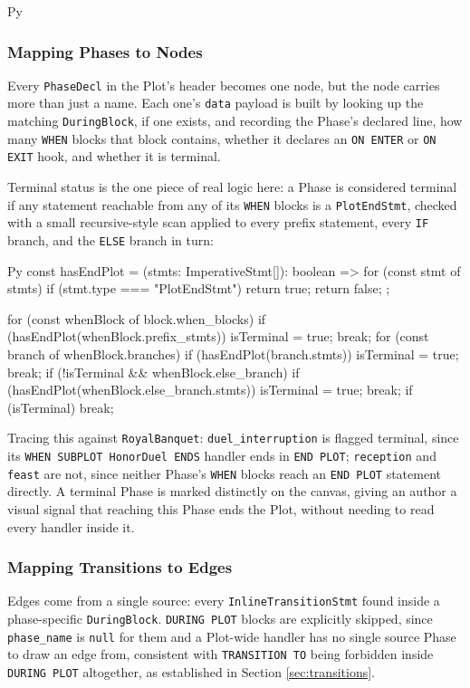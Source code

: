 \begin{codeblock}[]{Py}
\subsubsection{Mapping Phases to Nodes}
Every \lstinline|PhaseDecl| in the Plot's header becomes one node, but the node carries more than just a name. Each one's \lstinline|data| payload is built by looking up the matching \lstinline|DuringBlock|, if one exists, and recording the Phase's declared line, how many \lstinline|WHEN| blocks that block contains, whether it declares an \lstinline|ON ENTER| or \lstinline|ON EXIT| hook, and whether it is terminal.

Terminal status is the one piece of real logic here: a Phase is considered terminal if any statement reachable from any of its \lstinline|WHEN| blocks is a \lstinline|PlotEndStmt|, checked with a small recursive-style scan applied to every prefix statement, every \lstinline|IF| branch, and the \lstinline|ELSE| branch in turn:
\begin{codeblock}[]{Py}
const hasEndPlot = (stmts: ImperativeStmt[]): boolean => {
    for (const stmt of stmts) {
        if (stmt.type === "PlotEndStmt") return true;
    }
    return false;
};

for (const whenBlock of block.when_blocks) {
    if (hasEndPlot(whenBlock.prefix_stmts)) { isTerminal = true; break; }
    for (const branch of whenBlock.branches) {
        if (hasEndPlot(branch.stmts)) { isTerminal = true; break; }
    }
    if (!isTerminal && whenBlock.else_branch) {
        if (hasEndPlot(whenBlock.else_branch.stmts)) { isTerminal = true; break; }
    }
    if (isTerminal) break;
}
\end{codeblock}
Tracing this against \lstinline|RoyalBanquet|: \lstinline|duel_interruption| is flagged terminal, since its \lstinline|WHEN SUBPLOT HonorDuel ENDS| handler ends in \lstinline|END PLOT|; \lstinline|reception| and \lstinline|feast| are not, since neither Phase's \lstinline|WHEN| blocks reach an \lstinline|END PLOT| statement directly. A terminal Phase is marked distinctly on the canvas, giving an author a visual signal that reaching this Phase ends the Plot, without needing to read every handler inside it.

\subsubsection{Mapping Transitions to Edges}
Edges come from a single source: every \lstinline|InlineTransitionStmt| found inside a phase-specific \lstinline|DuringBlock|. \lstinline|DURING PLOT| blocks are explicitly skipped, since \lstinline|phase_name| is \lstinline|null| for them and a Plot-wide handler has no single source Phase to draw an edge from, consistent with \lstinline|TRANSITION TO| being forbidden inside \lstinline|DURING PLOT| altogether, as established in Section \ref{sec:transitions}.


\end{codeblock}
